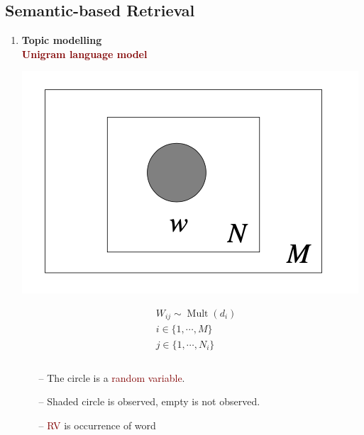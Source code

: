 \subsection{Semantic-based Retrieval}
\begin{enumerate}
    \setlength\itemsep{0em}
    \item \textbf{Topic modelling}  \\
    \textbf{\textcolor{Maroon}{Unigram language model}} \\
    \begin{minipage}{0.3\textwidth}
        \includegraphics[scale=0.5]{figures/uni1.png}
    \end{minipage}
    \begin{minipage}{0.2\textwidth}
        $$
        \begin{aligned}
        &W_{ij} \sim \operatorname{Mult}(d_i) \\
        &i \in \{1, \cdots, M\} \\
        &j \in \{1, \cdots, N_i\} \\
        & \\
        \end{aligned}
        $$
    \end{minipage}
    \begin{minipage}{0.5\textwidth}
        \begin{itemize}
            \setlength\itemsep{0em}
            \item[--] The circle is a \textcolor{Maroon}{random variable}.
            \item[--] Shaded circle is observed, empty is not observed.
            \item[--] \textcolor{Maroon}{RV} is occurrence of word
        \end{itemize}
    \end{minipage}
    

\end{enumerate}

